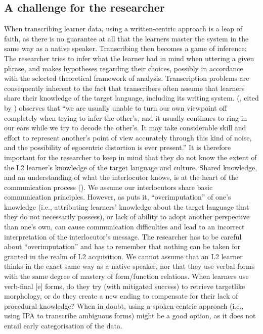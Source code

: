 \documentclass[output=paper,colorlinks,citecolor=brown,modfonts,nonflat]{../langscibook}
\begin{document}
\subsection{ \textbf{A challenge for the researcher}}%

When transcribing learner data, using a written-centric approach is a leap of faith, as there is no guarantee at all that the learners master the system in the same way as a native speaker. Transcribing then becomes a game of inference: The researcher tries to infer what the learner had in mind when uttering a given phrase, and makes hypotheses regarding their choices, possibly in accordance with the selected theoretical framework of analysis. Transcription problems are consequently inherent to the fact that transcribers often assume that learners share their knowledge of the target language, including its writing system. \citeauthor{Flavell1977} (\citeyear{Flavell1977}, cited by \citealt[739]{Nickerson1999}) observes that “we are usually unable to turn our own viewpoint off completely when trying to infer the other’s, and it usually continues to ring in our ears while we try to decode the other’s. It may take considerable skill and effort to represent another’s point of view accurately through this kind of noise, and the possibility of egocentric distortion is ever present.” It is therefore important for the researcher to keep in mind that they do not know the extent of the L2 learner’s knowledge of the target language and culture. Shared knowledge, and an understanding of what the interlocutor knows, is at the heart of the communication process (\citealt{Nickerson1999,KeysarEtAl2003}). We assume our interlocutors share basic communication principles. However, as \citet{Nickerson1999} puts it, “overimputation” of one’s knowledge (i.e., attributing learners’ knowledge about the target language that they do not necessarily possess), or lack of ability to adopt another perspective than one’s own, can cause communication difficulties and lead to an incorrect interpretation of the interlocutor’s message. The researcher has to be careful about “overimputation” and has to remember that nothing can be taken for granted in the realm of L2 acquisition. We cannot assume that an L2 learner thinks in the exact same way as a native speaker, nor that they use verbal forms with the same degree of mastery of form/function relations. When learners use verb-final [e] forms, do they try (with mitigated success) to retrieve targetlike morphology, or do they create a new ending to compensate for their lack of procedural knowledge? When in doubt, using a spoken-centric approach (i.e., using IPA to transcribe ambiguous forms) might be a good option, as it does not entail early categorisation of the data.
\end{document}

